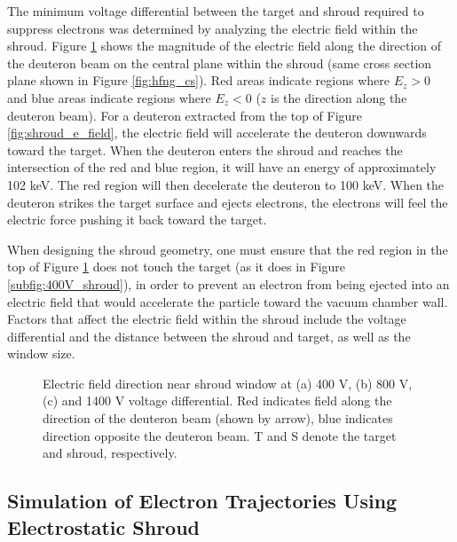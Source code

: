 \documentclass[aps,prstab,twocolumn,superscriptaddress]{revtex4-1}
\begin{document}
The minimum voltage differential between the target and shroud required to suppress electrons was determined by analyzing the electric field within the shroud.  Figure \ref{fig:shroud_e_fields} shows the magnitude of the electric field along the direction of the deuteron beam on the central plane within the shroud (same cross section plane shown in Figure \ref{fig:hfng_cs}). Red areas indicate regions where $E_z>0$ and blue areas indicate regions where $E_z<0$ ($z$ is the direction along the deuteron beam). For a deuteron extracted from the top of Figure \ref{fig:shroud_e_field}, the electric field will accelerate the deuteron downwards toward the target. When the deuteron enters the shroud and reaches the intersection of the red and blue region, it will have an energy of approximately 102 keV. The red region will then decelerate the deuteron to 100 keV. When the deuteron strikes the target surface and ejects electrons, the electrons will feel the electric force pushing it back toward the target.

When designing the shroud geometry, one must ensure that the red region in the top of Figure \ref{fig:shroud_e_fields} does not touch the target (as it does in Figure \ref{subfig:400V_shroud}), in order to prevent an electron from being ejected into an electric field that would accelerate the particle toward the vacuum chamber wall. Factors that affect the electric field within the shroud include the voltage differential and the distance  between the shroud and target, as well as the window size. 

\begin{figure}
	\centering
	\hfill
	\hfill
	\caption{Electric field direction near shroud window at (a) 400 V, (b) 800 V, (c) and 1400 V voltage differential. Red indicates field along the direction of the deuteron beam (shown by arrow), blue indicates direction opposite the deuteron beam. T and S denote the target and shroud, respectively.}
	\label{fig:shroud_e_fields}
\end{figure}

\subsection{Simulation of Electron Trajectories Using Electrostatic Shroud}
\end{document}
